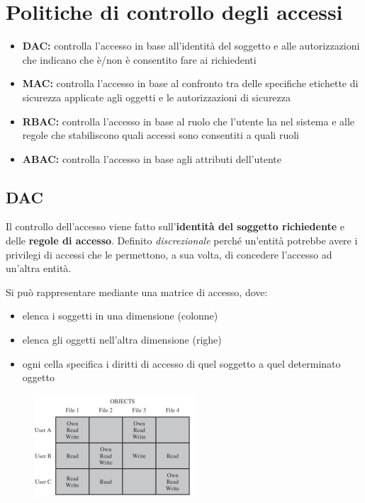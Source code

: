 \section{Politiche di controllo degli accessi}
\begin{itemize}
    \item \textbf{DAC:} controlla l'accesso in base all'identità del soggetto e alle autorizzazioni 
    che indicano che è/non è consentito fare ai richiedenti 
    \item \textbf{MAC:} controlla l'accesso in base al confronto tra delle specifiche etichette di sicurezza 
    applicate agli oggetti e le autorizzazioni di sicurezza 
    \item \textbf{RBAC:} controlla l'accesso in base al ruolo che l'utente ha nel sistema e alle regole 
    che stabiliscono quali accessi sono consentiti a quali ruoli 
    \item \textbf{ABAC:} controlla l'accesso in base agli attributi dell'utente
\end{itemize}

\subsection{DAC}
Il controllo dell'accesso viene fatto sull'\textbf{identità del soggetto richiedente} 
e delle \textbf{regole di accesso}. Definito \textit{discrezionale} perché un'entità potrebbe 
avere i privilegi di accessi che le permettono, a sua volta, di concedere l'accesso ad 
un'altra entità.

\noindent Si può rappresentare mediante una matrice di accesso, dove:
\begin{itemize}
    \item elenca i soggetti in una dimensione (colonne)
    \item elenca gli oggetti nell'altra dimensione (righe)
    \item ogni cella specifica i diritti di accesso di quel soggetto a quel determinato oggetto 
\end{itemize}

\begin{figure}[H]
    \centering
    \includegraphics[width=0.8\linewidth]{chapters/3/images/dac-matrix.png}
\end{figure}


